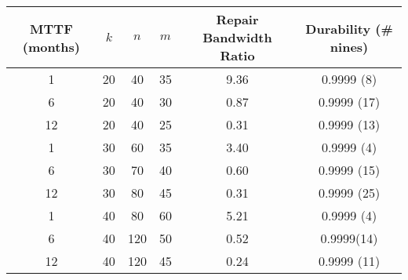 \begin{table}[H]\centering


\begin{tabular}{| c | c c c | c | c|}\hline
MTTF (months) &$k$& $n$ & $m$ &Repair Bandwidth Ratio&Durability (\# nines) \\\hline 
1 &20& 40 & 35 & 9.36 & 0.9999 (8) \\ 
6 &20& 40 & 30 & 0.87 & 0.9999 (17) \\  
12 &20& 40 & 25 & 0.31 & 0.9999 (13)\\\hline

1 &30& 60 & 35 & 3.40 &0.9999 (4)\\  
6 &30& 70 & 40 & 0.60 &0.9999 (15)\\  
12 &30& 80 & 45 & 0.31 &0.9999 (25) \\\hline

1 &40& 80 & 60 & 5.21 &0.9999 (4)\\  
6 &40&120&50 & 0.52 &0.9999(14)\\  
12 &40&120&45 & 0.24 &0.9999 (11)\\\hline

\end{tabular}
\end{table}